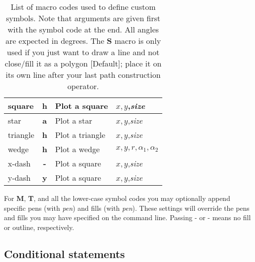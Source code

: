 \begin{table}[H]
\begin{tabular}{|l|c|l|l|}
square		&	\textbf{h}	& Plot a square 			& $x, y$,\emph{size}  \\ \hline
star		&	\textbf{a}	& Plot a star 				& $x, y$,\emph{size}  \\ \hline
triangle	&	\textbf{h}	& Plot a triangle 			& $x, y$,\emph{size}  \\ \hline
wedge		&	\textbf{h}	& Plot a wedge 				& $x, y, r, \alpha_1, \alpha_2$  \\ \hline
x-dash		&	\textbf{-}	& Plot a square 			& $x, y$,\emph{size}  \\ \hline
y-dash		&	\textbf{y}	& Plot a square 			& $x, y$,\emph{size}  \\ \hline
\end{tabular}
\label{tbl:custsymb}
\caption{List of macro codes used to define custom symbols.  Note that arguments are given first with the symbol code at the end.
All angles are expected in degrees. The \textbf{S} macro is only used if you just want to draw a line and not close/fill it as
a polygon [Default]; place it on its own line after your last path construction operator.}
\end{table} 
For \textbf{M}, \textbf{T}, and all the lower-case symbol codes you may optionally append specific pens (with \emph{pen})
and fills (with \emph{pen}).  These settings will override the pens and fills you may have specified
on the command line.  Passing - or - means no fill or outline, respectively.

\subsection{Conditional statements}

